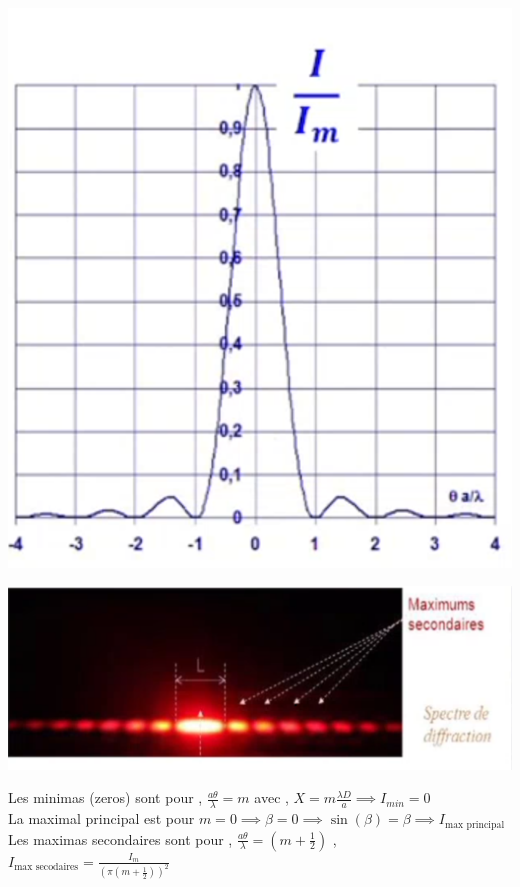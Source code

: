 \documentclass[12pt]{book}
\begin{document}
                \begin{center}
                    \begin{minipage}{0.39\linewidth}
                        \includegraphics[width=\linewidth]{pic/diffractioncourbe.png}
                    \end{minipage}
                    \begin{minipage}{0.59\linewidth}
                        \includegraphics[width=\linewidth]{pic/diffractionimage1.png}
                    \end{minipage}
                \end{center}
                Les minimas (zeros) sont pour  , $\frac{a\theta}{\lambda}=m $ avec  , $X=m\frac{\lambda D}{a} \implies I_{min} = 0$ \\
                La maximal principal est pour  $m = 0 \implies \beta =0 \implies \sin(\beta ) = \beta \implies I_{\text{max principal}}$\\
                Les maximas secondaires sont pour  , $\frac{a\theta}{\lambda} = (m+\frac{1}{2})$  ,\\  $I_{\text{max secodaires}} = \frac{I_m}{(\pi(m+\frac{1}{2}))^2}$
\end{document}

